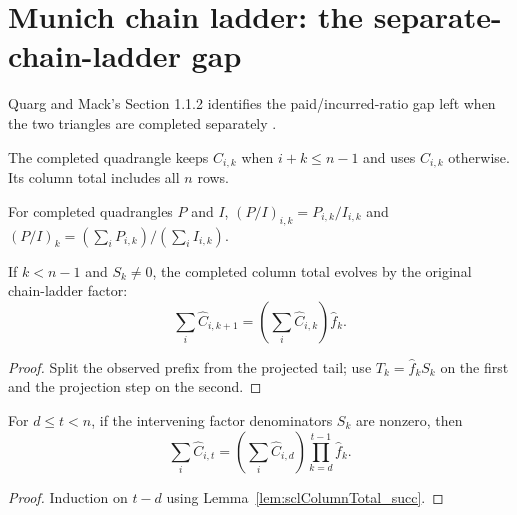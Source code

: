 \chapter{Munich chain ladder: the separate-chain-ladder gap}

Quarg and Mack's Section 1.1.2 identifies the paid/incurred-ratio gap left when
the two triangles are completed separately \cite{QuargMack2004}.

\begin{definition}\label{def:sclQuadrangle}\leanok
{}
The completed quadrangle keeps $C_{i,k}$ when $i+k\le n-1$ and uses
$\hat C_{i,k}$ otherwise.  Its column total includes all $n$ rows.
\end{definition}

\begin{definition}\label{def:paidIncurredRatio}\leanok
For completed quadrangles $P$ and $I$, $(P/I)_{i,k}=P_{i,k}/I_{i,k}$ and
$(P/I)_k=(\sum_i P_{i,k})/(\sum_i I_{i,k})$.
\end{definition}

\begin{lemma}\label{lem:sclColumnTotal_succ}\leanok
{}
If $k<n-1$ and $S_k\ne0$, the completed column total evolves by the original
chain-ladder factor:
\[
  \sum_i \hat C_{i,k+1}=\left(\sum_i \hat C_{i,k}\right)\hat f_k.
\]
\end{lemma}
\begin{proof}\leanok Split the observed prefix from the projected tail; use $T_k=\hat f_kS_k$ on the first and the projection step on the second. \end{proof}

\begin{lemma}\label{lem:sclColumnTotal_eq_mul_prod}\leanok
{}
For $d\le t<n$, if the intervening factor denominators $S_k$ are nonzero, then
\[
  \sum_i \hat C_{i,t}=\left(\sum_i \hat C_{i,d}\right)
    \prod_{k=d}^{t-1}\hat f_k.
\]
\end{lemma}
\begin{proof}\leanok Induction on $t-d$ using Lemma~\ref{lem:sclColumnTotal_succ}. \end{proof}

